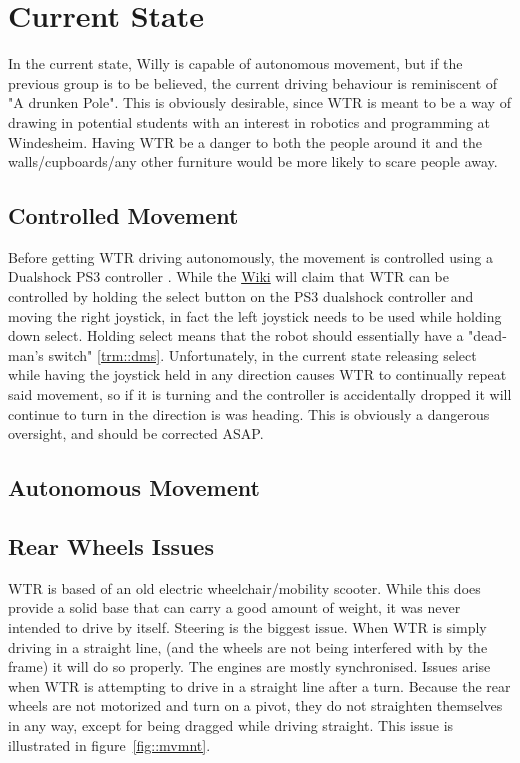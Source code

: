 \section{Current State}
In the current state, Willy is capable of autonomous movement, but if the previous group is to be believed, the current driving behaviour is reminiscent of "A drunken Pole".
This is obviously desirable, since WTR is meant to be a way of drawing in potential students with an interest in robotics and programming at Windesheim.
Having WTR be a danger to both the people around it and the walls/cupboards/any other furniture would be more likely to scare people away.

\subsection{Controlled Movement}
Before getting WTR driving autonomously, the movement is controlled using a Dualshock PS3 controller \cite{dualshock}.
While the \href{ https://windesheim-willy.github.io/WillyWiki/components/joystick.html}{Wiki} will claim that WTR can be controlled by holding the select button on the PS3 dualshock controller and moving the right joystick, in fact the left joystick needs to be used while holding down select.
Holding select means that the robot should essentially have a "dead-man's switch" \ref{trm::dms}.
Unfortunately, in the current state releasing select while having the joystick held in any direction causes WTR to continually repeat said movement, so if it is turning and the controller is accidentally dropped it will continue to turn in the direction is was heading.
This is obviously a dangerous oversight, and should be corrected ASAP.

\subsection{Autonomous Movement}
\clearpage

\subsection{Rear Wheels Issues}
WTR is based of an old electric wheelchair/mobility scooter.
While this does provide a solid base that can carry a good amount of weight, it was never intended to drive by itself.
Steering is the biggest issue.
When WTR is simply driving in a straight line, (and the wheels are not being interfered with by the frame) it will do so properly.
The engines are mostly synchronised.
Issues arise when WTR is attempting to drive in a straight line after a turn.
Because the rear wheels are not motorized and turn on a pivot, they do not straighten themselves in any way, except for being dragged while driving straight.
This issue is illustrated in figure~\ref{fig::mvmnt}.


